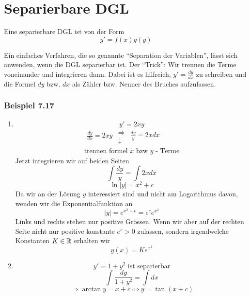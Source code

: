\section{Separierbare DGL}
\begin{definition}{7.16}
Eine separierbare DGL ist von der Form \[y'=f(x)g(y)\]
\end{definition}
Ein einfaches Verfahren, die so genannte ``Separation der Variablen'', lässt sich anwenden, wenn die DGL separierbar ist. Der ``Trick'': Wir trennen die Terme voneinander und integrieren dann. Dabei ist es hilfreich, $y'=\frac{dy}{dx}$ zu schreiben und die Formel $dy$ bzw. $dx$ als Zähler bzw. Nenner des Bruches aufzufassen.

\subsubsection*{Beispiel 7.17}
\begin{enumerate}
\item \[y'=2xy\]\[\begin{array}{l}
\begin{array}{*{20}{c}}
{\frac{{dy}}{{dx}} = 2xy}\\
{}
\end{array}\begin{array}{*{20}{c}}
 \Rightarrow \\
 \downarrow
\end{array}\begin{array}{*{20}{c}}
{\frac{{dy}}{y} = 2xdx}\\
{}
\end{array}\\
{\text{trennen formel }}x{\text{ bzw }}y{\text{ - Terme}}
\end{array}\]
Jetzt integrieren wir auf beiden Seiten \[\int{\frac{dy}{y}}=\int{2xdx}\]
\[\ln\left| y\right|=x^2+c\]Da wir an der Lösung $y$ interessiert sind und nicht am Logarithmus davon, wenden wir die Exponentialfunktion an \[\left| y\right|=e^{x^2+c}=e^ce^{x^2}\]
Links und rechts stehen nur positive Grössen. Wenn wir aber auf der rechten Seite nicht nur positive konstante $e^c>0$ zulassen, sondern irgendwelche Konstanten $K\in\mathbb{R}$ erhalten wir \[y(x)=Ke^{x^2}\]
\item \[y'=1+y^2\text{ ist separierbar}\]
\[\int{\frac{dy}{1+y^2}=\int{dx}}\]
\[\Rightarrow \arctan y=x+c \Leftrightarrow y=\tan(x+c)\]
\end{enumerate}
